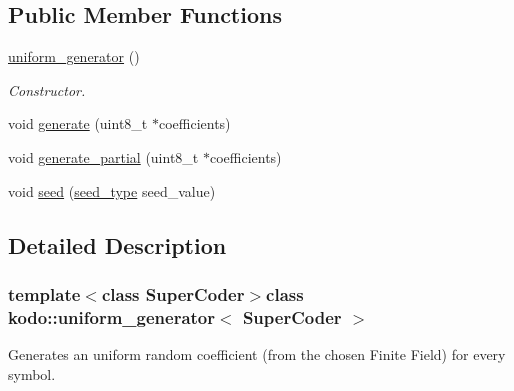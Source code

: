 \subsection*{Public Member Functions}
\begin{DoxyCompactItemize}
\item 
\hypertarget{classkodo_1_1uniform__generator_a1729e3e17b43d642c184fd1c895334cc}{\hyperlink{classkodo_1_1uniform__generator_a1729e3e17b43d642c184fd1c895334cc}{uniform\-\_\-generator} ()}\label{classkodo_1_1uniform__generator_a1729e3e17b43d642c184fd1c895334cc}

\begin{DoxyCompactList}\small\item\em Constructor. \end{DoxyCompactList}\item 
void \hyperlink{classkodo_1_1uniform__generator_af46febf68f07fc48c735c499d131e511}{generate} (uint8\-\_\-t $\ast$coefficients)
\begin{DoxyCompactList}\small\item\em \end{DoxyCompactList}\item 
void \hyperlink{classkodo_1_1uniform__generator_acc0f9cd49d60547b2214fbf7fb1d9b66}{generate\-\_\-partial} (uint8\-\_\-t $\ast$coefficients)
\begin{DoxyCompactList}\small\item\em \end{DoxyCompactList}\item 
void \hyperlink{classkodo_1_1uniform__generator_aaf140a1654dff4501873f71ad5143950}{seed} (\hyperlink{classkodo_1_1uniform__generator_a6db7150ba4f8c591c9cfbbb8e3b0e6b3}{seed\-\_\-type} seed\-\_\-value)
\begin{DoxyCompactList}\small\item\em \end{DoxyCompactList}\end{DoxyCompactItemize}


\subsection{Detailed Description}
\subsubsection*{template$<$class Super\-Coder$>$class kodo\-::uniform\-\_\-generator$<$ Super\-Coder $>$}

Generates an uniform random coefficient (from the chosen Finite Field) for every symbol. 


